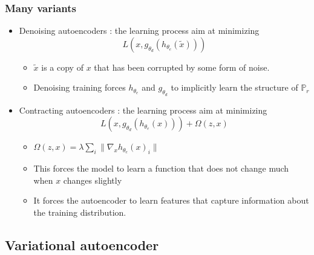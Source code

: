 \documentclass[french,9pt]{beamer}
\begin{document}
\begin{frame}
\frametitle{Many variants}

\begin{itemize}
\item Denoising autoencoders : the learning process aim at minimizing $$L(x,g_{\theta_{d}}(h_{\theta_{e}}(\tilde{x})))$$
\begin{itemize}
\item $\tilde{x}$ is a copy of $x$ that has been corrupted by some form of noise.
\item Denoising training forces $h_{\theta_{e}}$ and $g_{\theta_{d}}$ to implicitly learn the structure of $\mathbb{P}_{r}$
\end{itemize}
\item Contracting autoencoders : the learning process aim at minimizing $$L(x,g_{\theta_{d}}(h_{\theta_{e}}(x))) + \Omega(z,x)$$
\begin{itemize}
\item $\Omega(z,x) = \lambda \sum_{i} \| \nabla_{x} h_{\theta_{e}}(x)_{i} \|$
\item This forces the model to learn a function that does not change much when $x$ changes slightly
\item It forces the autoencoder to learn features that capture information about the training distribution.
\end{itemize}
\end{itemize}


\end{frame}





\subsection{Variational autoencoder}

\end{document}
